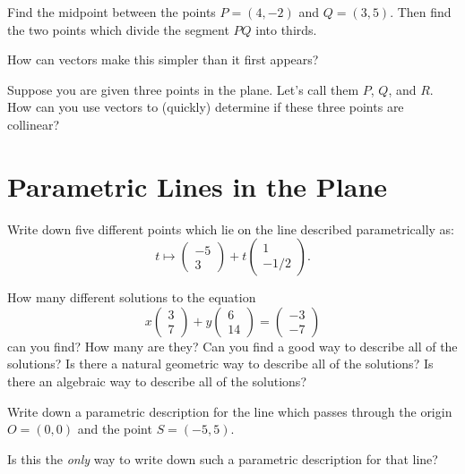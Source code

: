 \documentclass[cahier-main.tex]{subfiles}
\begin{document}
\begin{task}
Find the midpoint between the points $P = (4,-2)$ and $Q=(3,5)$. Then find the two points which divide the segment $PQ$ into thirds.

How can vectors make this simpler than it first appears?
\end{task}

\begin{challenge}
Suppose you are given three points in the plane. Let's call them $P$, $Q$, and $R$.
How can you use vectors to (quickly) determine if these three points are collinear?
\end{challenge}

\section*{Parametric Lines in the Plane}

\begin{task}
Write down five different points which lie on the line described parametrically as:
\[
t \mapsto \begin{pmatrix} -5\\3 \end{pmatrix} + t \begin{pmatrix}1\\-1/2\end{pmatrix}.
\]
\end{task}


\begin{challenge}
How many different solutions to the equation
\[
x\begin{pmatrix} 3 \\ 7\end{pmatrix} + y \begin{pmatrix} 6 \\ 14 \end{pmatrix}
= \begin{pmatrix} -3 \\ -7 \end{pmatrix}
\]
can you find? How many are they? Can you find a good way to describe all of the solutions? Is there a natural geometric way to describe all of the solutions? Is there an algebraic way to describe all of the solutions?
\end{challenge}


\begin{task}\label{task:line-through-origin}
Write down a parametric description for the line which passes through the origin $O=(0,0)$ and the 
point $S = (-5,5)$.

Is this the \emph{only} way to write down such a parametric description for that line?
\end{task}
\end{document}
